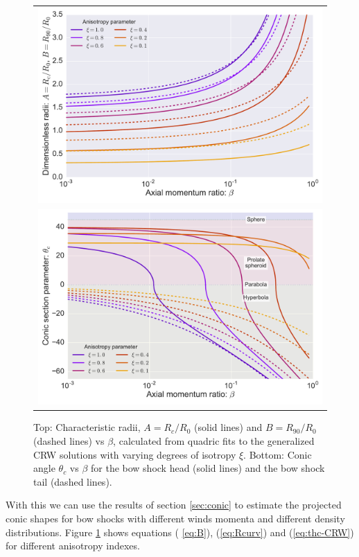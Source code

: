 \begin{figure}
\begin{tabular}{c}
\includegraphics[width=\linewidth]{figs/AB-beta-log} \\
\includegraphics[width=\linewidth]{figs/thc-beta-log}
\end{tabular}
\caption{Top: Characteristic radii, $A = R_c/R_0$ (solid lines) and $B
  = R_{90}/R_0$ (dashed lines)
  vs $\beta$, calculated from quadric fits to the generalized CRW
  solutions with varying degrees of isotropy $\xi$.  Bottom: Conic
  angle $\theta_c$ vs $\beta$ for the bow 
  shock head (solid lines) and the bow shock tail (dashed lines).}
\label{fig:rad-beta}
\end{figure}



With this we can use the results of section \ref{sec:conic} to estimate the projected conic shapes for bow shocks with different winds 
momenta and different density distributions. Figure \ref{fig:rad-beta} shows equations ( \ref{eq:B}), (\ref{eq:Rcurv}) and (\ref{eq:thc-CRW}) for different anisotropy indexes. 





